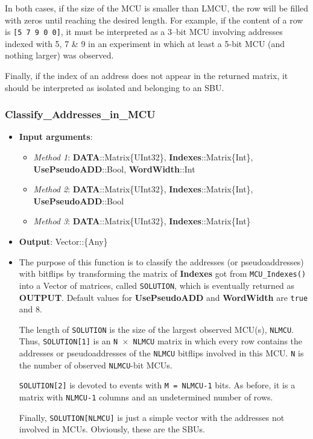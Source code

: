 \begin{itemize}
     In both cases, if the size of the MCU is smaller than LMCU, the row will be filled with zeros until
     reaching the desired length. For example, if the content of a row is \texttt{[5 7 9 0 0]}, it must be interpreted
     as a 3--bit MCU involving addresses indexed with 5, 7 \& 9 in an experiment in which at least a 5-bit 
     MCU (and nothing larger) was observed.
     
 	Finally, if the index of an address does not appear in the returned matrix, it should be interpreted as  isolated and belonging to an SBU.
 	
 \end{itemize}
%
\subsubsection*{Classify\_Addresses\_in\_MCU}
%
\begin{itemize}
	\item \textbf{Input arguments}: 
		\begin{itemize}
			\item \textit{Method 1}: \textbf{DATA}::Matrix\{UInt32\}, 
			\textbf{Indexes}::Matrix\{Int\}, 
			\textbf{UsePseudoADD}::Bool, 
			\textbf{WordWidth}::Int
			\item \textit{Method 2}: \textbf{DATA}::Matrix\{UInt32\}, 
			\textbf{Indexes}::Matrix\{Int\}, 
			\textbf{UsePseudoADD}::Bool 
			\item \textit{Method 3}: \textbf{DATA}::Matrix\{UInt32\}, 
			\textbf{Indexes}::Matrix\{Int\}
		\end{itemize}
	\item \textbf{Output}: Vector::\{Any\}
	\item The purpose of this function is to classify the addresses (or pseudoaddresses) with bitflips by transforming the matrix of \textbf{Indexes} got from \texttt{MCU\_Indexes()} into a Vector of matrices, called \texttt{SOLUTION}, which is eventually returned as \textbf{OUTPUT}. Default values for \textbf{UsePseudoADD} and \textbf{WordWidth} are \texttt{true} and 8.
	 
	The length of \texttt{SOLUTION} is the size of the largest observed MCU(s), \texttt{NLMCU}. Thus, \texttt{SOLUTION[1]} is an \texttt{N \(\times\) NLMCU} matrix in which every row contains the addresses or pseudoaddresses of the \texttt{NLMCU} 	bitflips involved in this MCU. \texttt{N} is the number of observed \texttt{NLMCU}-bit MCUs.
	
	\texttt{SOLUTION[2]} is devoted to events with \texttt{M = NLMCU-1} bits. As before, it is a matrix with \texttt{NLMCU-1} 	columns and an undetermined number of rows.
	
	Finally, \texttt{SOLUTION[NLMCU]} is just a simple vector with the addresses not involved in MCUs. Obviously, these are the SBUs.
	
	
\end{itemize}

